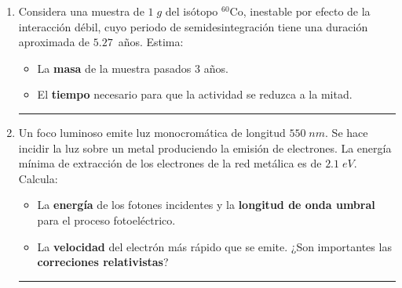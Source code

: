 \documentclass[a4paper,14pt]{exam}
\newcommand*\chem[1]{\ensuremath{\mathrm{#1}}}
\newcommand{\halmos}{\vspace*{-6mm}
	
					\begin{flushright}
						\rule{1mm}{2.5mm} 
					\end{flushright}\vspace*{-8mm}
						
					  }
\renewcommand{\qed}{\halmos}
\begin{document}
\newpage
{}


 \marginsize{.5cm}{0.9cm}{1.2cm}{.2cm}
    
\vspace*{-5ex}


\begin{enumerate}
				
	\item Considera una muestra de $1\;g$ del isótopo $^{60}\chem{Co}$, inestable por efecto de la interacción débil, cuyo periodo de semidesintegración tiene una duración aproximada de $5.27\,$ años. Estima:
	\begin{itemize}
		\item[a)] La \textbf{masa} de la muestra pasados $3$ años.
		\item[b)] El \textbf{tiempo} necesario para que la actividad se reduzca a la mitad.
	\end{itemize}
	\qed
	
	\vspace{2ex}
	
		\item Un foco luminoso emite luz monocromática de longitud $550\;nm$. Se hace incidir 				la luz sobre un metal produciendo la emisión de electrones. La energía mínima de extracción de los 						electrones de la red metálica es de $2.1\;eV$. Calcula:
			\begin{itemize}
				\item[a)] La \textbf{energía} de los fotones incidentes y la \textbf{longitud de onda umbral} para el proceso fotoeléctrico.
				\item[b)] La \textbf{velocidad} del electrón más rápido que se emite. ¿{Son importantes} las \textbf{correciones relativistas}?
			\end{itemize}		 
		\qed	
		
	

\end{enumerate}
\end{document}
